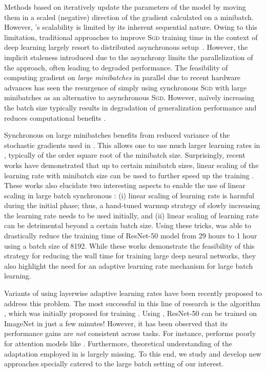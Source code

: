 \documentclass{article} \usepackage{iclr2020_conference,times}
\newcommand{\sgd}{\textsc{Sgd}\xspace}
\begin{document}
Methods based on  iteratively update the parameters of the model by moving them in a scaled (negative) direction of the gradient calculated on a minibatch.   However, 's scalability is limited by its inherent sequential nature. Owing to this limitation, traditional approaches to improve \sgd training time in the context of deep learning largely resort to distributed asynchronous setup~\citep{dean2012large,recht2011hogwild}. However,  the implicit staleness introduced due to the asynchrony limits the parallelization of the approach, often leading to degraded performance. The feasibility of computing gradient on \emph{large minibatches} in parallel due to recent hardware advances has seen the resurgence of simply using synchronous \sgd with large minibatches as an alternative to asynchronous \sgd. However, na\"ively increasing the batch size typically results in degradation of generalization performance and reduces computational benefits \citep{goyal2017accurate}.

Synchronous  on large minibatches benefits from reduced variance of the stochastic gradients used in . This allows one to use much larger learning rates in , typically of the order square root of the minibatch size. Surprisingly, recent works have demonstrated that up to certain minibatch sizes, linear scaling of the learning rate with minibatch size can be used to further speed up the training \cite{goyal2017accurate}. These works also elucidate two interesting aspects to enable the use of linear scaling in large batch synchronous : (i) linear scaling of learning rate is harmful during the initial phase; thus, a hand-tuned warmup strategy of slowly increasing the learning rate needs to be used initially, and (ii) linear scaling of learning rate can be detrimental beyond a certain batch size. Using these tricks, \cite{goyal2017accurate} was able to drastically reduce the training time of ResNet-50 model from 29 hours to 1 hour using a batch size of 8192. While these works demonstrate the feasibility of this strategy for reducing the wall time for training large deep neural networks, they also highlight the need for an adaptive learning rate mechanism for large batch learning. 

Variants of  using layerwise adaptive learning rates have been recently proposed to address this problem. The most successful in this line of research is the  algorithm \citep{you2017scaling}, which was initially proposed for training . Using , ResNet-50 can be trained on ImageNet in just a few minutes! However, it has been observed that its performance gains are \emph{not} consistent across tasks. For instance,  performs poorly for attention models like . Furthermore, theoretical understanding of the adaptation employed in  is largely missing. To this end, we study and develop new approaches specially catered to the large batch setting of our interest.
\end{document}
